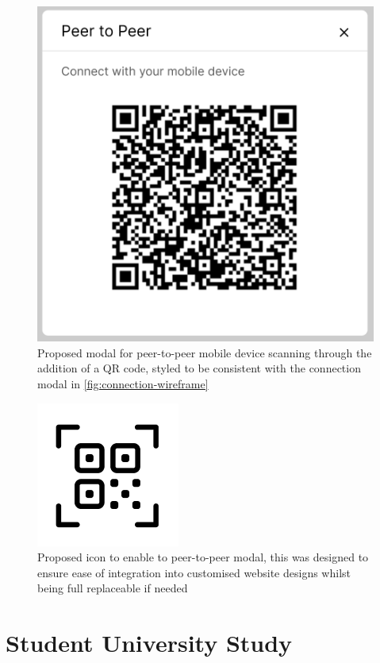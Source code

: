 \documentclass{l4proj}
\begin{document}
\begin{appendices}
\begin{figure}[H]
    \centering
    \includegraphics[width=12cm]{dissertation/images/wireframe-qr.png}
    \caption{Proposed modal for peer-to-peer mobile device scanning through the addition of a QR code, styled to be consistent with the connection modal in \ref{fig:connection-wireframe}}
    \label{fig:qr-wireframe}
\end{figure}

\begin{figure}[H]
    \centering
    \includegraphics{dissertation/images/wireframe-qr-icon.png}
    \caption{Proposed icon to enable to peer-to-peer modal, this was designed to ensure ease of integration into customised website designs whilst being full replaceable if needed}
    \label{fig:qr-icon-wireframe}
\end{figure}

\chapter{Student University Study}


\end{appendices}
\end{document}

